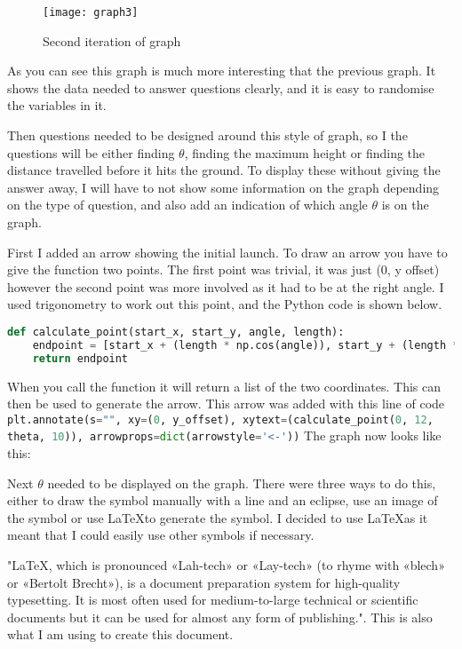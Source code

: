 \begin{figure}[H]
	\centering
	\texttt{[image: graph3]}
	\caption{Second iteration of graph}
\end{figure}
As you can see this graph is much more interesting that the previous graph. It shows the data needed to answer questions clearly, and it is easy to randomise the variables in it. 

Then questions needed to be designed around this style of graph, so I the questions will be either finding $\theta$, finding the maximum height or finding the distance travelled before it hits the ground. To display these without giving the answer away, I will have to not show some information on the graph depending on the type of question, and also add an indication of which angle $\theta$ is on the graph. 

First I added an arrow showing the initial launch. To draw an arrow you have to give the function two points. The first point was trivial, it was just (0, y offset) however the second point was more involved as it had to be at the right angle. I used trigonometry to work out this point, and the Python code is shown below.
\begin{lstlisting}[language=Python, caption=Arrow coordinate generator]
def calculate_point(start_x, start_y, angle, length):
	endpoint = [start_x + (length * np.cos(angle)), start_y + (length * np.sin(angle))]
	return endpoint
\end{lstlisting}
When you call the function it will return a list of the two coordinates. This can then be used to generate the arrow. This arrow was added with this line of code 
\lstinline[language=Python]|plt.annotate(s="", xy=(0, y_offset), xytext=(calculate_point(0, 12, theta, 10)), arrowprops=dict(arrowstyle='<-'))|
The graph now looks like this:

Next $\theta$ needed to be displayed on the graph. There were three ways to do this, either to draw the symbol manually with a line and an eclipse, use an image of the symbol or use \LaTeX to generate the symbol. I decided to use \LaTeX as it meant that I could easily use other symbols if necessary. 

"LaTeX, which is pronounced «Lah-tech» or «Lay-tech» (to rhyme with «blech» or «Bertolt Brecht»), is a document preparation system for high-quality typesetting. It is most often used for medium-to-large technical or scientific documents but it can be used for almost any form of publishing."\autocite{latex}. This is also what I am using to create this document.


